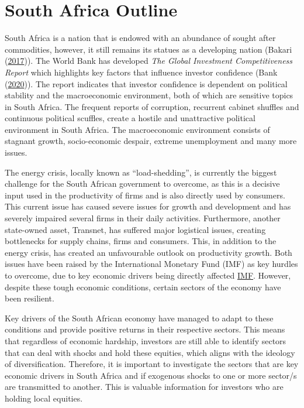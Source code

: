 \documentclass[11pt,preprint, authoryear]{elsarticle}
\numberwithin{equation}{section}
\numberwithin{figure}{section}
\numberwithin{table}{section}
\begin{document}
\hypertarget{south-africa-outline}{%
\section{South Africa Outline}\label{south-africa-outline}}

South Africa is a nation that is endowed with an abundance of sought
after commodities, however, it still remains its statues as a developing
nation (Bakari (\protect\hyperlink{ref-RePEc:pra:mprapa:80763}{2017})).
The World Bank has developed \emph{The Global Investment Competitiveness
Report} which highlights key factors that influence investor confidence
(Bank (\protect\hyperlink{ref-world2020global}{2020})). The report
indicates that investor confidence is dependent on political stability
and the macroeconomic environment, both of which are sensitive topics in
South Africa. The frequent reports of corruption, recurrent cabinet
shuffles and continuous political scuffles, create a hostile and
unattractive political environment in South Africa. The macroeconomic
environment consists of stagnant growth, socio-economic despair, extreme
unemployment and many more issues.

The energy crisis, locally known as ``load-shedding'', is currently the
biggest challenge for the South African government to overcome, as this
is a decisive input used in the productivity of firms and is also
directly used by consumers. This current issue has caused severe issues
for growth and development and has severely impaired several firms in
their daily activities. Furthermore, another state-owned asset,
Transnet, has suffered major logistical issues, creating bottlenecks for
supply chains, firms and consumers. This, in addition to the energy
crisis, has created an unfavourable outlook on productivity growth. Both
issues have been raised by the International Monetary Fund (IMF) as key
hurdles to overcome, due to key economic drivers being directly affected
\href{https://www.imf.org/en/News/Articles/2023/03/21/mcs032223-south-africa-2023-article-iv-mission}{IMF}.
However, despite these tough economic conditions, certain sectors of the
economy have been resilient.

Key drivers of the South African economy have managed to adapt to these
conditions and provide positive returns in their respective sectors.
This means that regardless of economic hardship, investors are still
able to identify sectors that can deal with shocks and hold these
equities, which aligns with the ideology of diversification. Therefore,
it is important to investigate the sectors that are key economic drivers
in South Africa and if exogenous shocks to one or more sector/s are
transmitted to another. This is valuable information for investors who
are holding local equities.
\end{document}
